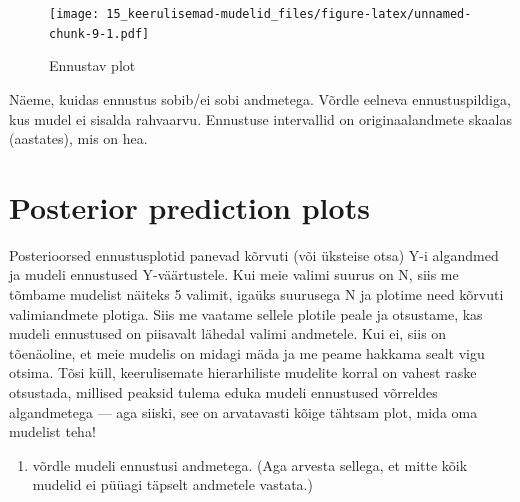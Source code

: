 \documentclass[]{book}
\newenvironment{Shaded}{\begin{snugshade}}{\end{snugshade}}
\newcommand{\CommentTok}[1]{\textcolor[rgb]{0.56,0.35,0.01}{\textit{#1}}}
\newcommand{\DecValTok}[1]{\textcolor[rgb]{0.00,0.00,0.81}{#1}}
\newcommand{\KeywordTok}[1]{\textcolor[rgb]{0.13,0.29,0.53}{\textbf{#1}}}
\newcommand{\NormalTok}[1]{#1}
\newcommand{\OperatorTok}[1]{\textcolor[rgb]{0.81,0.36,0.00}{\textbf{#1}}}
\newcommand{\StringTok}[1]{\textcolor[rgb]{0.31,0.60,0.02}{#1}}
\providecommand{\tightlist}{%
  \setlength{\itemsep}{0pt}\setlength{\parskip}{0pt}}
\begin{document}
\begin{figure}
\centering
\texttt{[image: 15\_keerulisemad-mudelid\_files/figure-latex/unnamed-chunk-9-1.pdf]}
\caption{\label{fig:unnamed-chunk-9}Ennustav plot}
\end{figure}

Näeme, kuidas ennustus sobib/ei sobi andmetega. Võrdle eelneva ennustuspildiga, kus mudel ei sisalda rahvaarvu. Ennustuse intervallid on originaalandmete skaalas (aastates), mis on hea.

\hypertarget{posterior-prediction-plots}{%
\section*{Posterior prediction plots}\label{posterior-prediction-plots}}

Posterioorsed ennustusplotid panevad kõrvuti (või üksteise otsa) Y-i algandmed ja mudeli ennustused Y-väärtustele. Kui meie valimi suurus on N, siis me tõmbame mudelist näiteks 5 valimit, igaüks suurusega N ja plotime need kõrvuti valimiandmete plotiga. Siis me vaatame sellele plotile peale ja otsustame, kas mudeli ennustused on piisavalt lähedal valimi andmetele. Kui ei, siis on tõenäoline, et meie mudelis on midagi mäda ja me peame hakkama sealt vigu otsima. Tõsi küll, keerulisemate hierarhiliste mudelite korral on vahest raske otsustada, millised peaksid tulema eduka mudeli ennustused võrreldes algandmetega --- aga siiski, see on arvatavasti kõige tähtsam plot, mida oma mudelist teha!

\begin{enumerate}
\def\labelenumi{\arabic{enumi})}
\tightlist
\item
  võrdle mudeli ennustusi andmetega. (Aga arvesta sellega, et mitte kõik mudelid ei püüagi täpselt andmetele vastata.)
\end{enumerate}

\begin{Shaded}
\end{Shaded}
\end{document}
